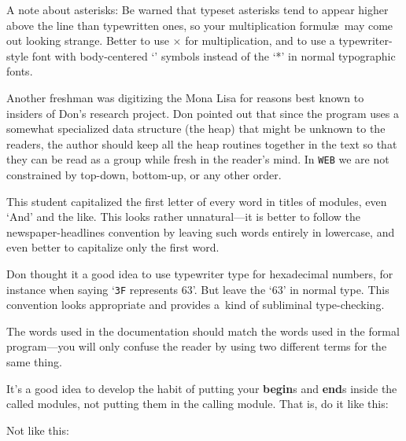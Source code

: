 A note about asterisks: Be warned that typeset asterisks tend to appear
higher above the line than typewritten ones, so your multiplication formul\ae\
may come out looking strange. Better to use $\times$ for multiplication,
and to use a typewriter-style font with body-centered `{\tt *}' symbols
instead of the `*' in normal typographic fonts.

Another freshman was digitizing the Mona Lisa for reasons best known
to insiders of Don's research project.
 Don pointed out that since the program uses a somewhat
specialized data structure (the heap) that might be unknown to the
readers, the author should keep all the heap routines together in the text so
that they can be read as a group while fresh in the reader's mind.
In {\tt WEB} we are not constrained by top-down, bottom-up, or any other
order.

This student capitalized the first letter of every word in titles of modules,
 even `And' and the like. This looks rather unnatural---it
is better to follow the newspaper-headlines convention by leaving such
words entirely in lowercase, and even better to capitalize only the first word.

Don thought it a good idea to use typewriter type for hexadecimal
numbers, for instance when saying `{\tt 3F} represents 63'. But leave the
`63' in normal type. This convention looks appropriate and provides a~kind 
of subliminal type-checking.

The words used in the documentation should match the words used in the
formal program---you will only confuse the reader by using two
different terms for the same thing.

It's a good idea to develop the habit of putting your {\bf begin}s and
{\bf end}s inside the called modules, not putting them in the calling
module. That is, do it like this:

\smallskip
{}

\smallskip\noindent
Not like this:

\smallskip
{}

